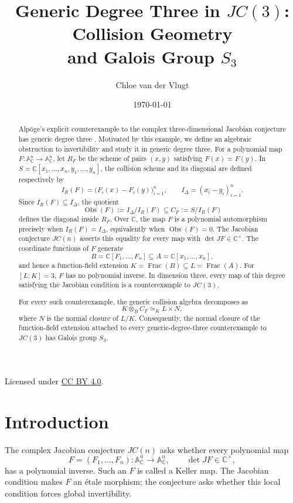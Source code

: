 \documentclass[11pt]{article}
\title{\texorpdfstring
  {Generic Degree Three in \(JC(3)\): Collision Geometry\\
   and Galois Group \(S_3\)}
  {Generic Degree Three in JC(3): Collision Geometry and Galois Group S3}}
\author{Chloe van der Vlugt}
\date{\today}
\theoremstyle{remark}
\DeclareMathOperator{\Frac}{Frac}
\newcommand{\A}{\mathbb A}
\newcommand{\C}{\mathbb C}
\newcommand{\Obs}{\operatorname{Obs}}
\begin{document}
\maketitle

\begin{abstract}
Alpöge's explicit counterexample to the complex three-dimensional Jacobian
conjecture has generic degree three
\cite[Theorem~3.3]{Gao2026Counterexamples}.  Motivated by this example, we
define an algebraic obstruction to invertibility and study it in generic
degree three.  For a polynomial map
\(F\colon\A^n_{\C}\to\A^n_{\C}\), let \(R_F\) be the scheme of pairs
\((x,y)\) satisfying \(F(x)=F(y)\).  In
\(S=\C[x_1,\dots,x_n,y_1,\dots,y_n]\), the collision scheme and its
diagonal are defined respectively by
\[
  I_R(F)=\bigl(F_i(x)-F_i(y)\bigr)_{i=1}^n,
  \qquad
  I_\Delta=(x_i-y_i)_{i=1}^n.
\]
Since \(I_R(F)\subseteq I_\Delta\), the quotient
\[
  \Obs(F):=I_\Delta/I_R(F)\subseteq C_F:=S/I_R(F)
\]
defines the diagonal inside \(R_F\).  Over \(\C\), the map \(F\) is a
polynomial automorphism precisely when \(I_R(F)=I_\Delta\), equivalently
when \(\Obs(F)=0\).  The Jacobian conjecture \(JC(n)\) asserts this
equality for every map with \(\det JF\in\C^\times\).
The coordinate functions of \(F\) generate
\[
  B=\C[F_1,\dots,F_n]\subseteq A=\C[x_1,\dots,x_n],
\]
and hence a function-field extension
\(K=\Frac(B)\subseteq L=\Frac(A)\).
For \([L:K]=3\), \(F\) has no polynomial inverse.  In dimension three,
every map of this degree satisfying the Jacobian condition is a
counterexample to \(JC(3)\).

For every such counterexample, the generic collision algebra decomposes as
\[
  K\otimes_B C_F\simeq_K L\times N,
\]
where \(N\) is the normal closure of \(L/K\).  Consequently, the normal
closure of the function-field extension attached to every
generic-degree-three counterexample to \(JC(3)\) has Galois group \(S_3\).
\end{abstract}

\begin{center}
  \small Licensed under
  \href{https://creativecommons.org/licenses/by/4.0/}
    {CC BY 4.0}.
\end{center}

\clearpage
\tableofcontents

\section{Introduction}
\label{sec:introduction}

The complex Jacobian conjecture \(JC(n)\) asks whether every polynomial map
\[
  F=(F_1,\dots,F_n)\colon\A^n_{\C}\longrightarrow\A^n_{\C},
  \qquad \det JF\in\C^\times,
\]
has a polynomial inverse.  Such an \(F\) is called a Keller map.  The
Jacobian condition makes \(F\) an \'etale morphism; the conjecture asks
whether this local condition forces global invertibility.
\end{document}
